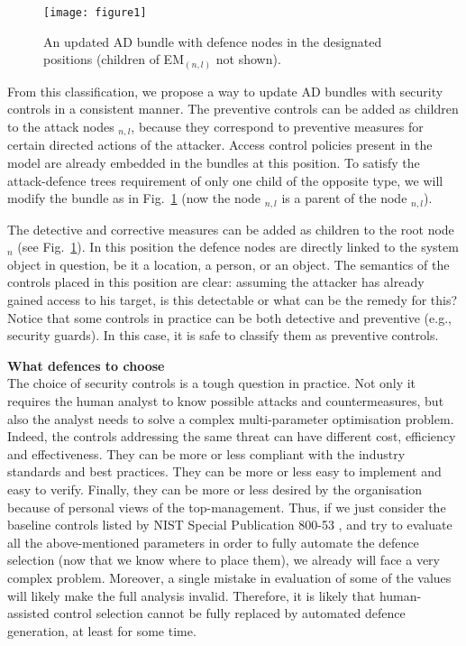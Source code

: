 \documentclass{llncs}
\begin{document}
\begin{figure}[htb]
\centering
\texttt{[image: figure1]}
\caption{An updated AD bundle with defence nodes in the designated positions (children of EM$_(n,l)$ not shown).}
\label{fig:updatedbundle}
\end{figure}


From this classification, we propose a way to update AD bundles with security controls in a consistent manner. The preventive controls can be added as children to the attack nodes \taccfrom$_{n,l}$, because they correspond to preventive measures for certain directed actions of the attacker. Access control policies present in the model are already embedded in the bundles at this position. To satisfy the attack-defence trees requirement of only one child of the opposite type, we will modify the bundle as in Fig.~\ref{fig:updatedbundle} (now the node \tpreventive$_{n,l}$ is a parent of the node \tdefence$_{n,l}$). 

The detective and corrective measures can be added as children to the root node \taccess$_n$ (see Fig.~\ref{fig:updatedbundle}). In this position the defence nodes are directly linked to the system object in question, be it a location, a person, or an object. The semantics of the controls placed in this position are clear: assuming the attacker has already gained access to his target, is this detectable or what can be the remedy for this? Notice that some controls in practice can be both detective and preventive (e.g., security guards). In this case, it is safe to classify them as preventive controls.

\textbf{What defences to choose}\\
The choice of security controls is a tough question in practice. Not only it requires the human analyst to know possible attacks and countermeasures, but also the analyst needs to solve a complex multi-parameter optimisation problem. Indeed, the controls addressing the same threat can have different cost, efficiency and effectiveness. They can be more or less compliant with the industry standards and best practices. They can be more or less easy to implement and easy to verify. Finally, they can be more or less desired by the organisation because of personal views of the top-management. Thus, if we just consider the baseline controls listed by NIST Special Publication 800-53 \cite{NIST-800-53}, and try to evaluate all the above-mentioned parameters in order to fully automate the defence selection (now that we know where to place them), we already will face a very complex problem. Moreover, a single mistake in evaluation of some of the values will likely make the full analysis invalid. Therefore, it is likely that human-assisted control selection cannot be fully replaced by automated defence generation, at least for some time.
\end{document}

